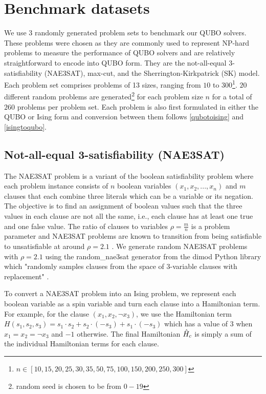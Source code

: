 \section{Benchmark datasets}
We use 3 randomly generated problem sets to benchmark our QUBO solvers. These problems were chosen as they are commonly used to represent NP-hard problems to measure the performance of QUBO solvers and are relatively straightforward to encode into QUBO form. They are the not-all-equal 3-satisfiability (NAE3SAT), max-cut, and the Sherrington-Kirkpatrick (SK) model. Each problem set comprises problems of 13 sizes, ranging from $10$ to $300$\footnote{$n \in [10,15,20,25,30,35,50,75,100,150,200,250,300]$}. $20$ different random problems are generated\footnote{random seed is chosen to be from $0-19$} for each problem size $n$ for a total of $260$ problems per problem set. Each problem is also first formulated in either the QUBO or Ising form and conversion between them follows \autoref{qubotoising} and \autoref{isingtoqubo}.

\subsection*{Not-all-equal 3-satisfiability (NAE3SAT)}
The NAE3SAT problem is a variant of the boolean satisfiability problem where each problem instance consists of $n$ boolean variables $(x_1, x_2, ..., x_n)$ and $m$ clauses that each combine three literals which can be a variable or its negation. The objective is to find an assignment of boolean values such that the three values in each clause are not all the same, i.e., each clause has at least one true and one false value. The ratio of clauses to variables $\rho = \frac{m}{n}$ is a problem parameter and NAE3SAT problems are known to transition from being satisfiable to unsatisfiable at around $\rho = 2.1$ \cite{nae3sattransition}. We generate random NAE3SAT problems with $\rho = 2.1$ using the random\_nae3sat generator from the dimod Python library which "randomly samples clauses from the space of 3-variable clauses with replacement" \cite{dimodrandomnae3sat}. 

To convert a NAE3SAT problem into an Ising problem, we represent each boolean variable as a spin variable and turn each clause into a Hamiltonian term. For example, for the clause $(x_1, x_2, \neg x_3)$, we use the Hamiltonian term $H(s_1, s_2, s_3) = s_1 \cdot s_2 + s_2 \cdot (-s_3) + s_1 \cdot (-s_3)$ which has a value of $3$ when $x_1=x_2=\neg x_3$ and $-1$ otherwise. The final Hamiltonian $\Hat{H}_c$ is simply a sum of the individual Hamiltonian terms for each clause.

